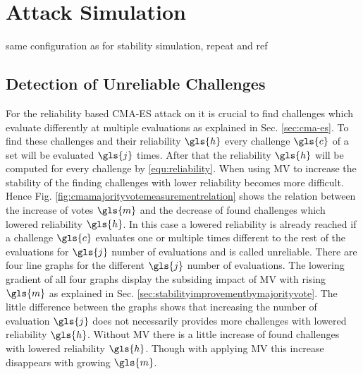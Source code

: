 \chapter{Attack Simulation}
\label{cap:attacksimulations}

same configuration as for stability simulation, repeat and ref


\section{Detection of Unreliable Challenges}

For the reliability based \ac{CMA-ES} attack on \apufs it is crucial to find challenges which evaluate differently at multiple evaluations as explained in Sec. \ref{sec:cma-es}.
To find these challenges and their reliability $\gls{h}$ every challenge $\gls{c}$ of a set will be evaluated $\gls{j}$ times.
After that the reliability $\gls{h}$ will be computed for every challenge by \ref{equ:reliability}.
When using \ac{MV} to increase the stability of the \apuf finding challenges with lower reliability becomes more difficult.
Hence Fig. \ref{fig:cmamajorityvotemeasurementrelation} shows the relation between the increase of votes $\gls{m}$ and the decrease of found challenges which lowered reliability $\gls{h}$.
In this case a lowered reliability is already reached if a challenge $\gls{c}$ evaluates one or multiple times different to the rest of the evaluations for $\gls{j}$ number of evaluations and is called unreliable.
There are four line graphs for the different $\gls{j}$ number of evaluations.
The lowering gradient of all four graphs display the subsiding impact of \ac{MV} with rising $\gls{m}$ as explained in Sec. \ref{sec:stabilityimprovementbymajorityvote}.
The little difference between the graphs shows that increasing the number of evaluation $\gls{j}$ does not necessarily provides more challenges with lowered reliability $\gls{h}$.
Without \ac{MV} there is a little increase of found challenges with lowered reliability $\gls{h}$.
Though with applying \ac{MV} this increase disappears with growing $\gls{m}$.

